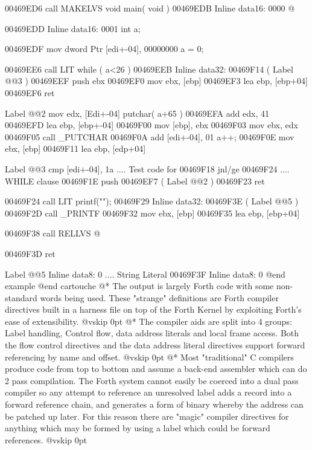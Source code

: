 00469ED6  call    MAKELVS                              void main( void )
00469EDB    Inline data16: 0000                        @{
00469EDD    Inline data16: 0001                          int a;

00469EDF  mov     dword Ptr [edi+-04], 00000000          a = 0;

00469EE6  call    LIT                                    while ( a<26 )
00469EEB    Inline data32: 00469F14 ( Label @@3 )
00469EEF  push    ebx
00469EF0  mov     ebx, [ebp]
00469EF3  lea     ebp, [ebp+04]
00469EF6  ret

Label @@2  mov     edx, [Edi+-04]                         putchar( a+65 )
00469EFA  add     edx, 41
00469EFD  lea     ebp, [ebp+-04]
00469F00  mov     [ebp], ebx
00469F03  mov     ebx, edx
00469F05  call    _PUTCHAR
00469F0A  add     [edi+-04], 01                          a++;
00469F0E  mov     ebx, [ebp]
00469F11  lea     ebp, [edp+04]

Label @@3  cmp     [edi+-04], 1a                          .... Test code for
00469F18  jnl/ge  00469F24                               .... WHILE clause
00469F1E  push    00469EF7 ( Label @@2 )
00469F23  ret

00469F24  call    LIT                                    printf("\n");
00469F29    Inline data32: 00469F3E ( Label @@5 )
00469F2D  call    _PRINTF
00469F32  mov     ebx, [ebp]
00469F35  lea     ebp, [ebp+04]

00469F38  call    RELLVS                               @}
00469F3D  ret

Label @@5    Inline data8: 0                            .... String Literal
00469F3F    Inline data8: 0 @end example
@end cartouche
@*
The output is largely Forth code with some non-standard
words being used. These "strange" definitions are Forth compiler
directives built in a harness file on top of the Forth Kernel by
exploiting Forth's ease of extensibility.
@vskip 0pt
@*
The compiler aids are split into 4 groups: Label handling, Control
flow, data address literals and local frame access. Both the flow
control directives and the data address literal directives support
forward referencing by name and offset.
@vskip 0pt
@*
Most "traditional" C compilers produce code from top to bottom and
assume a back-end assembler which can do 2 pass compilation. The
Forth system cannot easily be coerced into a dual pass compiler
so any attempt to reference an unresolved label adds a record into
a forward reference chain, and generates a form of binary whereby
the address can be patched up later. For this reason there are
"magic" compiler directives for anything which may be formed by
using a label which could be forward references.
@vskip 0pt

